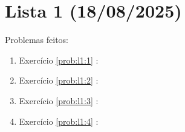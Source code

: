 \section{Lista 1 (18/08/2025)}

Problemas feitos:
\begin{enumerate}
    \item Exercício \ref{prob:l1:1} : \checkmark
    \item Exercício \ref{prob:l1:2} : \checkmark
    \item Exercício \ref{prob:l1:3} : \checkmark
    \item Exercício \ref{prob:l1:4} : \Frowny
\end{enumerate}

\begin{problem}
\label{prob:l1:1}   
\end{problem}

